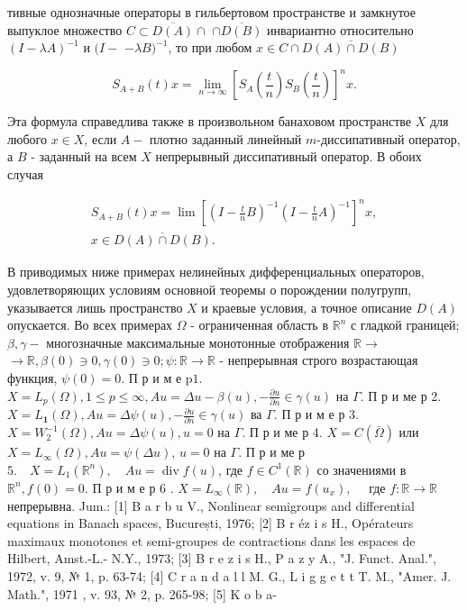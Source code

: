 \documentclass[10pt]{article}
\begin{document}
тивные однозначные операторы в гильбертовом пространстве и замкнутое выпуклое множество $C \subset \overline{D(A)} \cap$ $\cap \overline{D(B)}$ инвариантно относительно $(I-\lambda A)^{-1}$ и $(I-$ $-\lambda B)^{-1}$, то при любом $x \in C \cap \overline{D(A) \cap D(B)}$



\[

S_{A+B}(t) x=\lim _{n \rightarrow \infty}\left[S_{A}\left(\frac{t}{n}\right) S_{B}\left(\frac{t}{n}\right)\right]^{n} x .

\]



Эта формула справедлива также в произвольном банаховом пространстве $X$ для любого $x \in X$, если $A-$ плотно заданный линейный $m$-диссипативный оператор, а $B$ - заданный на всем $X$ непрерывный диссипативный оператор. В обоих случая



\[

\begin{gathered}

S_{A+B}(t) x=\lim \left[\left(I-\frac{t}{n} B\right)^{-1}\left(I-\frac{t}{n} A\right)^{-1}\right]^{n} x, \\

x \in \overline{D(A) \cap D(B)} .

\end{gathered}

\]



В приводимых ниже примерах нелинейных дифференциальных операторов, удовлетворяющих условиям основной теоремы о порождении полугрупп, указывается лишь пространство $X$ и краевые условия, а точное описание $D(A)$ опускается. Во всех примерах $\Omega$ - ограниченная область в $\mathbb{R}^{n}$ с гладкой границей; $\beta, \gamma-$ многозначные максимальные монотонные отображения $\mathbb{R} \rightarrow$ $\rightarrow \mathbb{R}, \beta(0) \ni 0, \gamma(0) \ni 0 ; \psi: \mathbb{R} \rightarrow \mathbb{R}$ - непрерывная строго возрастающая функция, $\psi(0)=0$. П р и м е $\mathrm{p} 1$. $X=L_{p}(\Omega), 1 \leqslant p \leqslant \infty, A u=\Delta u-\beta(u),-\frac{\partial u}{\partial n} \in \gamma(u)$ на $\Gamma$. П р и ме р 2. $X=L_{\mathbf{1}}(\Omega), A u=\Delta \psi(u),-\frac{\partial u}{\partial n} \in \gamma(u)$ ва $\Gamma$. П р и м е р 3. $X=W_{2}^{-1}(\Omega), A u=\Delta \psi(u), u=0$ на $\Gamma$. П р и ме р 4. $X=C(\bar{\Omega})$ или $X=L_{\infty}(\Omega), A u=\psi(\Delta u)$, $u=0$ на $\Gamma$. П р и ме р $5 . \quad X=L_{1}\left(\mathbb{R}^{n}\right), \quad A u=\operatorname{div} f(u)$, где $f \in C^{1}(\mathbb{R})$ со значениями в $\mathbb{R}^{n}, f(0)=0$. П р и м е р 6 . $X=L_{\infty}(\mathbb{R}), \quad A u=f\left(u_{x}\right), \quad$ где $f: \mathbb{R} \rightarrow \mathbb{R}$ непрерывна. Jum.: [1] B a r b u V., Nonlinear semigroups and differential equations in Banach spaces, București, 1976; [2] B r éz i s H., Opérateurs maximaux monotones et semi-groupes de contractions dans les espaces de Hilbert, Amst.-L.- N.Y., 1973; [3] B r e z i s H., P a z y A., "J. Funct. Anal.", 1972, v. 9, № 1, p. 63-74; [4] C r a n d a l l M. G., L i g g e t t T. M., "Amer. J. Math.", 1971 , v. 93, № 2, p. 265-98; [5] K o b a-
\end{document}
